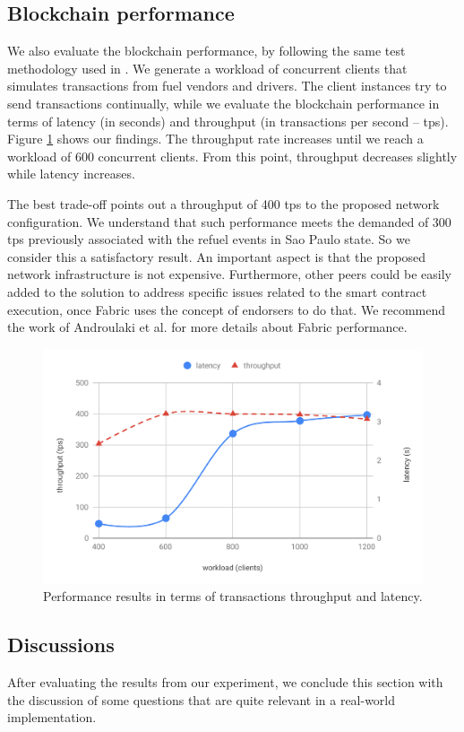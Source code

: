 \documentclass[sigplan]{acmart}
\begin{document}
\subsection{Blockchain performance}
We also evaluate the blockchain performance, by following the same test methodology used in \cite{MeloJr.2019}.
We generate a workload of concurrent clients that simulates transactions from fuel vendors and drivers.
The client instances try to send transactions continually, while we evaluate the blockchain performance in terms of latency (in seconds) and throughput (in transactions per second -- tps).
Figure \ref{f:performance} shows our findings.
The throughput rate increases until we reach a workload of 600 concurrent clients.
From this point, throughput decreases slightly while latency increases.

The best trade-off points out a throughput of 400 tps to the proposed network configuration.
We understand that such performance meets the demanded of 300 tps previously associated with the refuel events in Sao Paulo state.
So we consider this a satisfactory result.
An important aspect is that the proposed network infrastructure is not expensive.
Furthermore, other peers could be easily added to the solution to address specific issues related to the smart contract execution, once Fabric uses the concept of endorsers to do that.
We recommend the work of Androulaki et al. \cite{Androulaki2018} for more details about Fabric performance.

\begin{figure}[!t]
\centering
\includegraphics[width=.4\textwidth]{performance}
\caption{Performance results in terms of transactions throughput and latency.}
\label{f:performance}
\end{figure}

\subsection{Discussions}
After evaluating the results from our experiment, we conclude this section with the discussion of some questions that are quite relevant in a real-world implementation.
\end{document}
